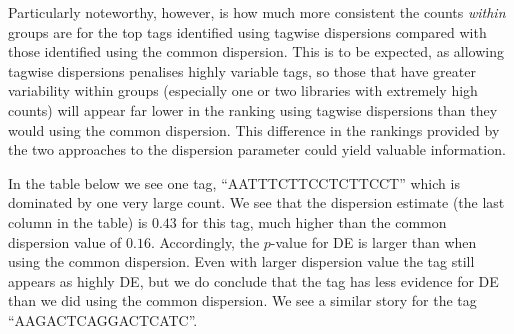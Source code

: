 Particularly noteworthy, however, is how much more consistent the
counts \emph{within} groups are for the top tags identified using
tagwise dispersions compared with those identified using the common
dispersion. This is to be expected, as allowing tagwise dispersions
penalises highly variable tags, so those that have greater variability
within groups (especially one or two libraries with extremely high
counts) will appear far lower in the ranking using tagwise dispersions
than they would using the common dispersion. This difference in the
rankings provided by the two approaches to the dispersion parameter
could yield valuable information. 

In the table below we see one tag, ``AATTTCTTCCTCTTCCT'' which is
dominated by one very large count. We see that the dispersion estimate
(the last column in the table) is $0.43$ for this tag, much higher
than the common dispersion value of $0.16$. Accordingly, the $p$-value
for DE is larger than when using the common dispersion. Even with
larger dispersion value the tag still appears as highly DE, but we do
conclude that the tag has less evidence for DE than we did using the
common dispersion. We see a similar story for the tag
``AAGACTCAGGACTCATC''.

